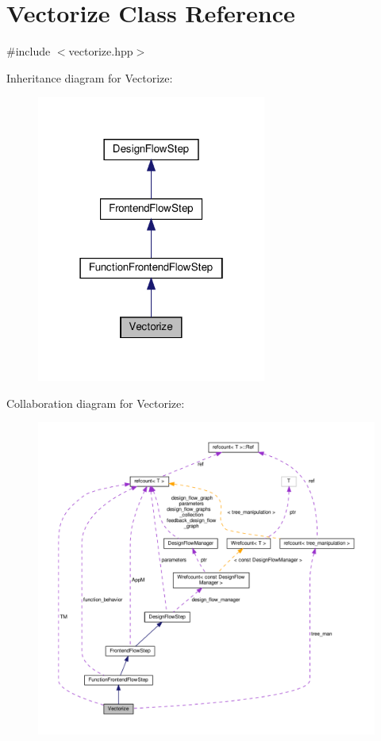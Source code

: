 \hypertarget{classVectorize}{}\section{Vectorize Class Reference}
\label{classVectorize}


{\ttfamily \#include $<$vectorize.\+hpp$>$}



Inheritance diagram for Vectorize\+:
\nopagebreak
\begin{figure}[H]
\begin{center}
\leavevmode
\includegraphics[width=214pt]{d5/dc6/classVectorize__inherit__graph}
\end{center}
\end{figure}


Collaboration diagram for Vectorize\+:
\nopagebreak
\begin{figure}[H]
\begin{center}
\leavevmode
\includegraphics[width=350pt]{d5/d6c/classVectorize__coll__graph}
\end{center}
\end{figure}
